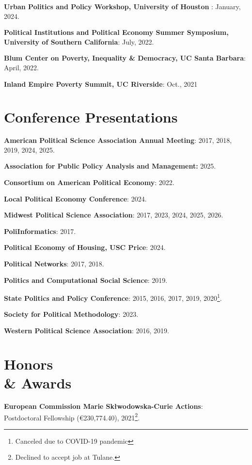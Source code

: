 \documentclass[margin,line]{res}
\begin{document}
\begin{resume}
{\bf Urban Politics and Policy Workshop, University of Houston }: January, 2024. 

{\bf Political Institutions and Political Economy Summer Symposium, University of Southern California}: July, 2022.

{\bf Blum Center on Poverty, Inequality \& Democracy, UC Santa Barbara}: April, 2022.

{\bf Inland Empire Poverty Summit, UC Riverside}: Oct., 2021
 


\section{\sc Conference Presentations} 
\vspace*{.1in}

{\bf American Political Science Association Annual Meeting}: 2017, 2018, 2019, 2024, 2025.

{\bf Association for Public Policy Analysis and Management:} 2025.

{\bf Consortium on American Political Economy}: 2022.

{\bf Local Political Economy Conference}: 2024. 

{\bf Midwest Political Science Association}: 2017, 2023, 2024, 2025, 2026. 

{\bf PoliInformatics}: 2017.

{\bf Political Economy of Housing, USC Price}: 2024.

{\bf Political Networks}: 2017, 2018.

{\bf Politics and Computational Social Science}: 2019.

{\bf State Politics and Policy Conference}: 2015, 2016, 2017, 2019, 2020\footnote{Canceled due to COVID-19 pandemic}.

{\bf Society for Political Methodology}: 2023. 

{\bf Western Political Science Association}: 2016, 2019.


\section{\sc Honors\\ \& Awards} 
\vspace*{.1in}

{\bf European Commission Marie Skłwodowska-Curie Actions}:\\ Postdoctoral Fellowship (€230,774.40),  2021\footnote{Declined to accept job at Tulane.}. 


\end{resume}
\end{document}
